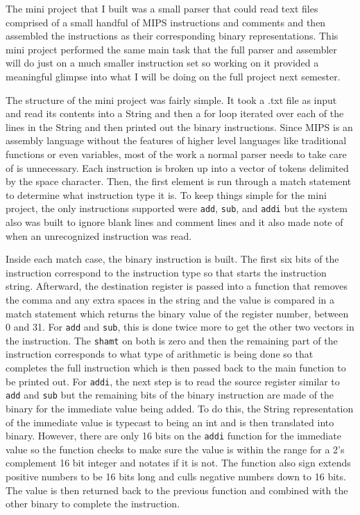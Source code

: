 \documentclass[
    paper=letter,
    parskip=half,
    fontsize=12pt,
    titlepage=firstiscover,
    toc=bibliography,
    numbers=endperiod
]{scrartcl}
\begin{document}
The mini project that I built was a small parser that could read text
files comprised of a small handful of MIPS instructions and comments and
then assembled the instructions as their corresponding binary
representations. This mini project performed the same main task that the
full parser and assembler will do just on a much smaller instruction set
so working on it provided a meaningful glimpse into what I will be doing
on the full project next semester.

The structure of the mini project was fairly simple. It took a .txt file
as input and read its contents into a String and then a for loop
iterated over each of the lines in the String and then printed out the
binary instructions. Since MIPS is an assembly language without the
features of higher level languages like traditional functions or even
variables, most of the work a normal parser needs to take care of is
unnecessary. Each instruction is broken up into a vector of tokens
delimited by the space character. Then, the first element is run through
a match statement to determine what instruction type it is. To keep
things simple for the mini project, the only instructions supported were
\texttt{add}, \texttt{sub}, and \texttt{addi} but the system also was
built to ignore blank lines and comment lines and it also made note of
when an unrecognized instruction was read.

Inside each match case, the binary instruction is built. The first six
bits of the instruction correspond to the instruction type so that
starts the instruction string. Afterward, the destination register is
passed into a function that removes the comma and any extra spaces in
the string and the value is compared in a match statement which returns
the binary value of the register number, between 0 and 31. For
\texttt{add} and \texttt{sub}, this is done twice more to get the other
two vectors in the instruction. The \texttt{shamt} on both is zero and
then the remaining part of the instruction corresponds to what type of
arithmetic is being done so that completes the full instruction which is
then passed back to the main function to be printed out. For
\texttt{addi}, the next step is to read the source register similar to
\texttt{add} and \texttt{sub} but the remaining bits of the binary
instruction are made of the binary for the immediate value being added.
To do this, the String representation of the immediate value is typecast
to being an int and is then translated into binary. However, there are
only 16 bits on the \texttt{addi} function for the immediate value so
the function checks to make sure the value is within the range for a 2's
complement 16 bit integer and notates if it is not. The function also
sign extends positive numbers to be 16 bits long and culls negative
numbers down to 16 bits. The value is then returned back to the previous
function and combined with the other binary to complete the instruction.
\end{document}
